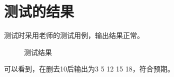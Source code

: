 \documentclass[UTF8]{ctexart}
\begin{document}
\section{测试的结果}   
 
    测试时采用老师的测试用例，输出结果正常。  
      
    \begin{figure}[htbp] %
        \centering
        \caption{测试结果} %
        \label{3} %
    \end{figure}
    可以看到，在删去10后输出为3 5 12 15 18，符合预期。
\end{document}
